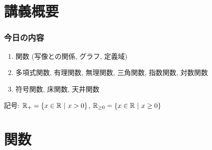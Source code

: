 




\section{講義概要}


\begin{frame}
\frametitle{今日の内容}



\begin{enumerate}
\item 関数 (写像との関係, グラフ, 定義域)
\item 多項式関数, 有理関数, 無理関数, 三角関数, 指数関数, 対数関数
\item 符号関数, 床関数, 天井関数
\end{enumerate} 



記号: $\R_+=\{ x \in \R \ | \ x>0\}$, $\R_{\ge0}=\{ x \in \R \ | \ x\ge 0\}$


\end{frame}





\section{関数}




